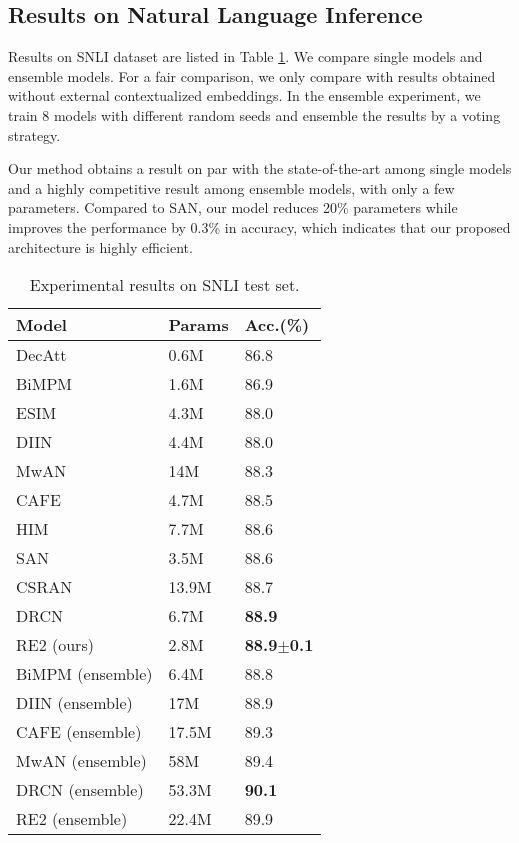 \documentclass[11pt,a4paper]{article}
\begin{document}
\subsection{Results on Natural Language Inference}

Results on SNLI dataset are listed in Table \ref{tab:snli-result}. We compare single models and ensemble models. For a fair comparison, we only compare with results obtained without external contextualized embeddings. In the ensemble experiment, we train 8 models with different random seeds and ensemble the results by a voting strategy. 

Our method obtains a result on par with the state-of-the-art among single models and a highly competitive result among ensemble models, with only a few parameters. Compared to SAN, our model reduces 20\% parameters while improves the performance by 0.3\% in accuracy, which indicates that our proposed architecture is highly efficient. 

\begin{table}
  \centering
  \small
  \begin{tabular}{|l|l|l|}
  \hline
  {\bf Model} & {\bf Params} & {\bf Acc.(\%)}\\\hline
    DecAtt \cite{parikh2016decomposable} & 0.6M & 86.8 \\
    BiMPM \cite{wang2017bilateral} & 1.6M & 86.9 \\
    ESIM \cite{chen2017enhanced} & 4.3M & 88.0 \\ 
    DIIN \cite{gong2018natural} & 4.4M & 88.0 \\ 
    MwAN \cite{tan2018multiway} & 14M & 88.3 \\
    CAFE \cite{tay2018compare} & 4.7M & 88.5 \\
    HIM \cite{chen2017enhanced} & 7.7M & 88.6 \\
    SAN \cite{liu2018stochastic} & 3.5M & 88.6 \\
    CSRAN \cite{tay2018co} & 13.9M & 88.7 \\
    DRCN \cite{kim2018semantic} & 6.7M & {\bf 88.9} \\\hline
    RE2 (ours)& 2.8M & {\bf 88.9$\pm$0.1}\\\hline
    BiMPM (ensemble) & 6.4M & 88.8 \\
    DIIN (ensemble) & 17M & 88.9 \\
    CAFE (ensemble) & 17.5M & 89.3 \\
    MwAN (ensemble) & 58M & 89.4 \\
    DRCN (ensemble) & 53.3M & {\bf 90.1} \\\hline
    RE2 (ensemble) & 22.4M & 89.9 \\\hline
  \end{tabular}
  \caption{Experimental results on SNLI test set.}\label{tab:snli-result}
\end{table}
\end{document}
